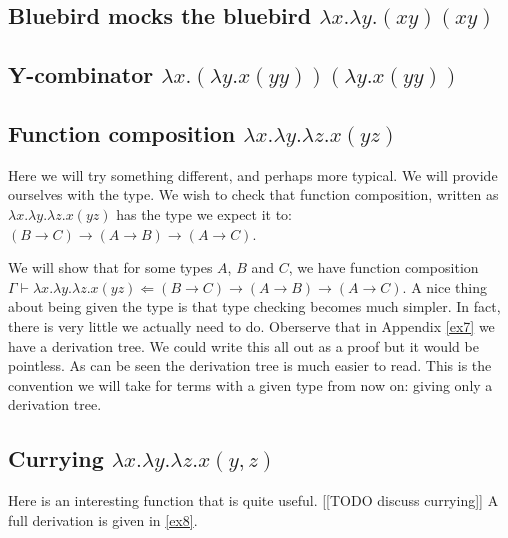 \begin{example}
\begin{example}
\end{example}

\subsection{Bluebird mocks the bluebird $\lambda x . \lambda y . (xy)(xy)$} %




\subsection{Y-combinator $\lambda x . (\lambda y . x (y y)) (\lambda y . x (y y))$} %



\subsection{Function composition $\lambda x . \lambda y . \lambda z . x ( y z)$} %

Here we will try something different, and perhaps more typical. We will provide ourselves with the type. We wish to check that function composition, written as $\lambda x.\lambda y.\lambda z.x(yz)$ has the type we expect it to: $(B \to C) \to (A \to B) \to (A \to C)$.

\begin{example}
    We will show that for some types $A$, $B$ and $C$, we have function composition $\Gamma \vdash \lambda x.\lambda y.\lambda z.x(yz) \Leftarrow (B \to C) \to (A \to B) \to (A \to C)$.
    A nice thing about being given the type is that type checking becomes much simpler. In fact, there is very little we actually need to do. Oberserve that in Appendix \ref{ex7} we have a derivation tree. We could write this all out as a proof but it would be pointless. As can be seen the derivation tree is much easier to read.
    This is the convention we will take for terms with a given type from now on: giving only a derivation tree.
    
\end{example}



\subsection{Currying $\lambda x . \lambda y . \lambda z . x (y, z)$} %
Here is an interesting function that is quite useful.
[[TODO discuss currying]]
A full derivation is given in \ref{ex8}.


\end{example}
